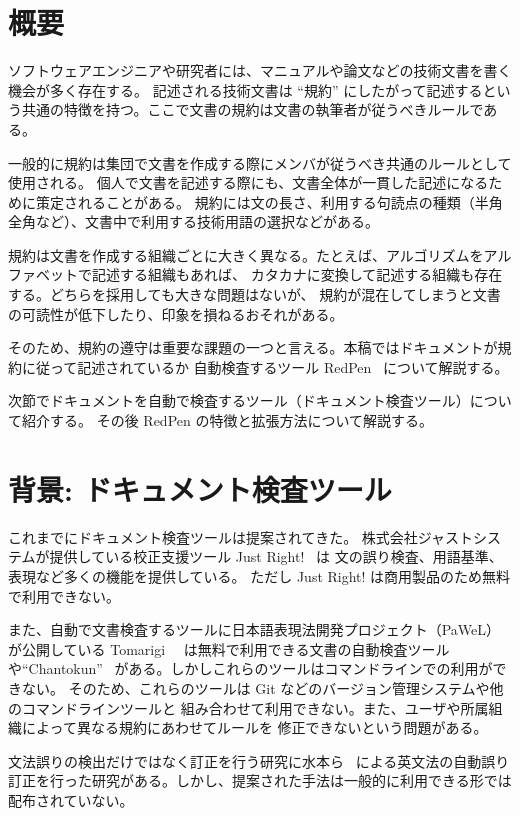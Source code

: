 \section{概要}

ソフトウェアエンジニアや研究者には、マニュアルや論文などの技術文書を書く機会が多く存在する。
記述される技術文書は ``規約'' にしたがって記述するという共通の特徴を持つ。ここで文書の規約は文書の執筆者が従うべきルールである。

一般的に規約は集団で文書を作成する際にメンバが従うべき共通のルールとして使用される。
個人で文書を記述する際にも、文書全体が一貫した記述になるために策定されることがある。
規約には文の長さ、利用する句読点の種類（半角全角など）、文書中で利用する技術用語の選択などがある。

規約は文書を作成する組織ごとに大きく異なる。たとえば、アルゴリズムをアルファベットで記述する組織もあれば、
カタカナに変換して記述する組織も存在する。どちらを採用しても大きな問題はないが、
規約が混在してしまうと文書の可読性が低下したり、印象を損ねるおそれがある。

そのため、規約の遵守は重要な課題の一つと言える。本稿ではドキュメントが規約に従って記述されているか
自動検査するツール RedPen~\cite{redpen}\cite{ito15repden} について解説する。

次節でドキュメントを自動で検査するツール（ドキュメント検査ツール）について紹介する。
その後 RedPen の特徴と拡張方法について解説する。

\section{背景: ドキュメント検査ツール}
これまでにドキュメント検査ツールは提案されてきた。
株式会社ジャストシステムが提供している校正支援ツール Just Right!~\cite{justright} は
文の誤り検査、用語基準、表現など多くの機能を提供している。
ただし Just Right! は商用製品のため無料で利用できない。

また、自動で文書検査するツールに日本語表現法開発プロジェクト（PaWeL）が公開している
 Tomarigi~\cite{tomarigi}~\cite{tomarigi-paper} は無料で利用できる文書の自動検査ツール
や``Chantokun''~\cite{chantokun} がある。しかしこれらのツールはコマンドラインでの利用ができない。
そのため、これらのツールは Git などのバージョン管理システムや他のコマンドラインツールと
組み合わせて利用できない。また、ユーザや所属組織によって異なる規約にあわせてルールを
修正できないという問題がある。

文法誤りの検出だけではなく訂正を行う研究に水本ら~\cite{mizumoto12english} による英文法の自動誤り
訂正を行った研究がある。しかし、提案された手法は一般的に利用できる形では配布されていない。

